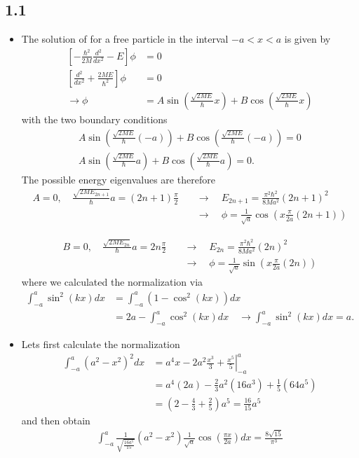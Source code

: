 \documentclass[../main.tex]{subfiles}
\begin{document}
\subsection{1.1}
\begin{itemize}
\item The solution of for a free particle in the interval $-a<x<a$ is given by
\begin{align}
    \left[-\frac{\hbar^2}{2M}\frac{d^2}{dx^2}-E\right]\phi&=0\\
    \left[\frac{d^2}{dx^2}+\frac{2ME}{\hbar^2}\right]\phi&=0\\
    \rightarrow\phi&=A\sin\left(\frac{\sqrt{2ME}}{\hbar}x\right)+B\cos\left(\frac{\sqrt{2ME}}{\hbar}x\right)
\end{align}    
with the two boundary conditions
\begin{align} 
A\sin\left(\frac{\sqrt{2ME}}{\hbar}(-a)\right)+B\cos\left(\frac{\sqrt{2ME}}{\hbar}(-a)\right)=0\\
A\sin\left(\frac{\sqrt{2ME}}{\hbar}a\right)+B\cos\left(\frac{\sqrt{2ME}}{\hbar}a\right)=0.
\end{align}
The possible energy eigenvalues are therefore
\begin{align}
    A=0,\quad\frac{\sqrt{2ME_{2n+1}}}{\hbar}a=(2n+1)\frac{\pi}{2}
    &\quad\rightarrow\quad E_{2n+1}=\frac{\pi^2\hbar^2}{8Ma^2}(2n+1)^2\\
    &\quad\rightarrow\quad
    \phi=\frac{1}{\sqrt{a}}\cos\left(x\frac{\pi}{2a}(2n+1)\right)
\end{align}   
    
\begin{align}    
    B=0,\quad\frac{\sqrt{2ME_{2n}}}{\hbar}a=2n\frac{\pi}{2}
    &\quad\rightarrow\quad E_{2n}=\frac{\pi^2\hbar^2}{8Ma^2}(2n)^2\\
    &\quad\rightarrow\quad
    \phi=\frac{1}{\sqrt{a}}\sin\left(x\frac{\pi}{2a}(2n)\right)
\end{align}
where we calculated the normalization via
\begin{align}
    \int_{-a}^a\sin^2(kx)dx
    &=\int_{-a}^a(1-\cos^2(kx))dx\\
    &=2a-\int_{-a}^a\cos^2(kx)dx\quad\rightarrow\int_{-a}^a\sin^2(kx)dx=a.
\end{align}

\item Lets first calculate the normalization
\begin{align}
    \int_{-a}^a(a^2-x^2)^2dx
    &=\left.a^4x-2a^2\frac{x^3}{3}+\frac{x^5}{5}\right|_{-a}^a\\
    &=a^4(2a)-\frac{2}{3}a^2(16a^3)+\frac{1}{5}(64a^5)\\
    &=\left(2-\frac{4}{3}+\frac{2}{5}\right)a^5=\frac{16}{15}a^5
\end{align}
and then obtain
\begin{align}
    \int_{-a}^a \frac{1}{\sqrt{\frac{16a^5}{15}}} \left(a^2-x^2\right)\frac{1}{\sqrt{a}} \cos \left(\frac{\pi  x}{2 a}\right)dx=\frac{8\sqrt{15}}{\pi^3}
\end{align}
\end{itemize}
\end{document}
